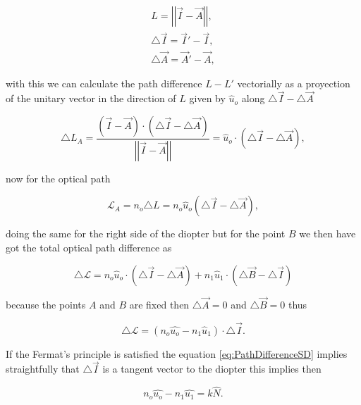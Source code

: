         \begin{align}
            L = \left|\left| \Vec{I} - \Vec{A} \right|\right|,\\
            \triangle\Vec{I} = \Vec{I}'-\Vec{I},\\
            \triangle\Vec{A} = \Vec{A}'-\Vec{A},
        \end{align}

        with this we can calculate the path difference $L - L'$ vectorially as a proyection of the unitary vector in the direction of $L$ given by $\hat{u}_o$ along $\triangle\Vec{I}-\triangle\Vec{A}$ 

        \begin{equation}
            \triangle L_A = \frac{\left(\Vec{I} - \Vec{A} \right)\cdot\left(\triangle \Vec{I} - \triangle \Vec{A} \right)}{\left|\left|\Vec{I} - \Vec{A} \right|\right|} = \hat{u}_o \cdot \left(\triangle\Vec{I}-\triangle\Vec{A} \right),
        \end{equation}

        now for the optical path

        \begin{equation}
            \mathcal{L}_A = n_o\triangle L = n_o\hat{u}_o \left(\triangle\Vec{I}-\triangle\Vec{A} \right),
        \end{equation}

        doing the same for the right side of the diopter but for the point $B$ we then have got the total optical path difference as

        \begin{equation}
            \triangle\mathcal{L} = n_o\hat{u}_o\cdot\left(\triangle\Vec{I}-\triangle\Vec{A} \right) + n_1\hat{u}_1\cdot\left(\triangle\Vec{B}-\triangle\Vec{I} \right)
        \end{equation}

        because the points $A$ and $B$ are fixed then $\triangle\Vec{A}=0$ and $\triangle\Vec{B}=0$ thus

        \begin{equation}\label{eq:PathDifferenceSD}
            \triangle\mathcal{L} = \left(n_o\hat{u_o}-n_1\hat{u}_1\right)\cdot\triangle\Vec{I}.
        \end{equation}

        If the Fermat's principle is satisfied the equation \ref{eq:PathDifferenceSD} implies straightfully that $\triangle\Vec{I}$ is a tangent vector to the diopter this implies then

        \begin{equation}\label{eq:SnellDescartes}
            n_o\hat{u_o}-n_1\hat{u_1} = k\hat{N}.
        \end{equation}

